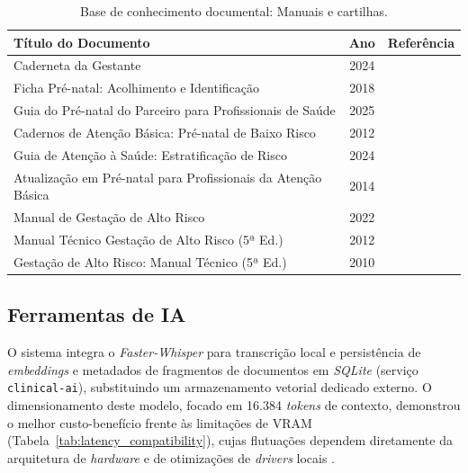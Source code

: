 \documentclass[12pt]{article}
\begin{document}
\begin{table}[H]
  \centering
  \caption{Base de conhecimento documental: Manuais e cartilhas.}
  \label{tab:cartilhas_sus}
  \small
  \begin{tabularx}{\textwidth}{>{\hsize=1.5\hsize}X c >{\hsize=0.5\hsize}X}
    \toprule
        \textbf{Título do Documento} & \textbf{Ano} & \textbf{Referência} \\ 
    \midrule
        Caderneta da Gestante                                          & 2024 & \cite{CadernetaGestante2024} \\
        Ficha Pré-natal: Acolhimento e Identificação                   & 2018 & \cite{FichaPreNatal2018} \\
        Guia do Pré-natal do Parceiro para Profissionais de Saúde      & 2025 & \cite{GuiaPreNatalParceiro2025} \\
        Cadernos de Atenção Básica: Pré-natal de Baixo Risco           & 2012 & \cite{CadernosAtencaoBasica32} \\
        Guia de Atenção à Saúde: Estratificação de Risco               & 2024 & \cite{GuiaAtencaoGestanteMG2024} \\
        Atualização em Pré-natal para Profissionais da Atenção Básica  & 2014 & \cite{AtualizacaoPreNatalSC2014} \\
        Manual de Gestação de Alto Risco                               & 2022 & \cite{ManualAltoRisco2022} \\
        Manual Técnico Gestação de Alto Risco (5ª Ed.)                 & 2012 & \cite{ManualAltoRisco2012} \\
        Gestação de Alto Risco: Manual Técnico (5ª Ed.)                & 2010 & \cite{ManualAltoRisco2010} \\
    \bottomrule
  \end{tabularx}
\end{table}

\subsection{Ferramentas de IA}

O sistema integra o \textit{Faster-Whisper} para transcrição local e persistência de \textit{embeddings} e metadados de fragmentos de documentos em \textit{SQLite} (serviço \texttt{clinical-ai}), substituindo um armazenamento vetorial dedicado externo.
O dimensionamento deste modelo, focado em 16.384 \textit{tokens} de contexto, demonstrou o melhor custo-benefício frente às limitações de VRAM (Tabela~\ref{tab:latency_compatibility}), cujas flutuações dependem diretamente da arquitetura de \textit{hardware} e de otimizações de \textit{drivers} locais \cite{VRAMCalculator}.
\end{document}
